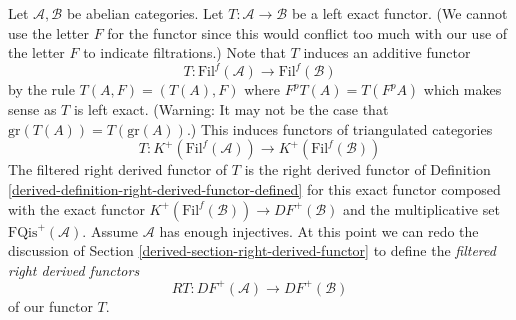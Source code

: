 Let $\mathcal{A}, \mathcal{B}$ be abelian categories.
Let $T : \mathcal{A} \to \mathcal{B}$ be a left exact functor.
(We cannot use the letter $F$ for the functor since this would
conflict too much with our use of the letter $F$ to indicate
filtrations.) Note that $T$ induces an additive functor
$$
T : \text{Fil}^f(\mathcal{A}) \to \text{Fil}^f(\mathcal{B})
$$
by the rule $T(A, F) = (T(A), F)$ where $F^pT(A) = T(F^pA)$ which makes
sense as $T$ is left exact. (Warning: It may not be the case that
$\text{gr}(T(A)) = T(\text{gr}(A))$.)
This induces functors of triangulated categories
\begin{equation}
\label{equation-induced-T-filtered}
T :
K^{+}(\text{Fil}^f(\mathcal{A}))
\longrightarrow
K^{+}(\text{Fil}^f(\mathcal{B}))
\end{equation}
The filtered right derived functor of $T$ is the right derived functor of
Definition \ref{derived-definition-right-derived-functor-defined}
for this exact functor composed with the exact functor
$K^{+}(\text{Fil}^f(\mathcal{B})) \to DF^{+}(\mathcal{B})$ and the
multiplicative set $\text{FQis}^{+}(\mathcal{A})$.
Assume $\mathcal{A}$ has enough injectives. At this point we can redo the
discussion of
Section \ref{derived-section-right-derived-functor}
to define the
{\it filtered right derived functors}
\begin{equation}
\label{equation-filtered-derived-functor}
RT : DF^{+}(\mathcal{A}) \longrightarrow DF^{+}(\mathcal{B})
\end{equation}
of our functor $T$.

